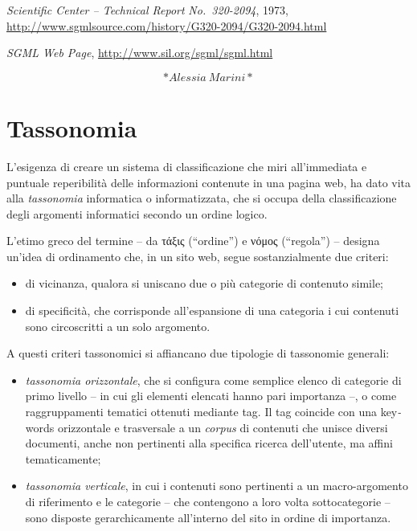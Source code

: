 \documentclass[
  b5paper,
  twoside,
  12pt,
  chapterprefix=false,
  bibliography=totocnumbered,
  parskip=false]{scrbook}
\begin{document}
\emph{Scientific Center -- Technical Report} \emph{No.~320-2094}, 1973,
\url{http://www.sgmlsource.com/history/G320-2094/G320-2094.html}

\emph{SGML Web Page}, \url{http://www.sil.org/sgml/sgml.html}

\[*Alessia~Marini*\]

\hypertarget{tassonomia}{%
\chapter{Tassonomia}\label{tassonomia}}

L'esigenza di creare un sistema di classificazione che miri
all'immediata e puntuale reperibilità delle informazioni contenute in
una pagina web, ha dato vita alla \emph{tassonomia} informatica o
informatizzata, che si occupa della classificazione degli argomenti
informatici secondo un ordine logico.

L'etimo greco del termine -- da τάξις (\enquote{ordine}) e νόμος (\enquote{regola}) --
designa un'idea di ordinamento che, in un sito web, segue
sostanzialmente due criteri:

\begin{itemize}
\item
  di vicinanza, qualora si uniscano due o più categorie di contenuto
  simile;
\item
  di specificità, che corrisponde all'espansione di una categoria i
  cui contenuti sono circoscritti a un solo argomento.
\end{itemize}

A questi criteri tassonomici si affiancano due tipologie di tassonomie
generali:

\begin{itemize}
\item
  \emph{tassonomia orizzontale}, che si configura come semplice elenco di
  categorie di primo livello -- in cui gli elementi elencati hanno
  pari importanza --, o come raggruppamenti tematici ottenuti mediante
  tag. Il tag coincide con una key\emph{-}words orizzontale e trasversale a
  un \emph{corpus} di contenuti che unisce diversi documenti, anche non
  pertinenti alla specifica ricerca dell'utente, ma affini
  tematicamente;
\item
  \emph{tassonomia verticale}, in cui i contenuti sono pertinenti a un
  macro-argomento di riferimento e le categorie -- che contengono a
  loro volta sottocategorie -- sono disposte gerarchicamente
  all'interno del sito in ordine di importanza.
\end{itemize}
\end{document}
